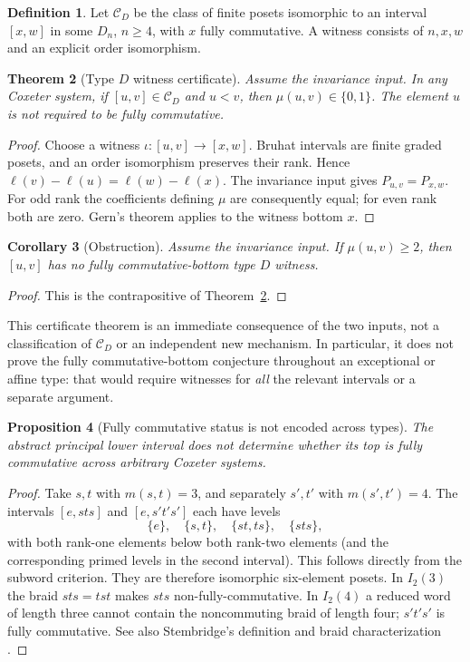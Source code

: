 \documentclass[11pt]{article}
\newtheorem{theorem}{Theorem}[section]
\newtheorem{corollary}[theorem]{Corollary}
\newtheorem{proposition}[theorem]{Proposition}
\theoremstyle{definition}\newtheorem{definition}[theorem]{Definition}
\theoremstyle{remark}\newtheorem{remark}[theorem]{Remark}
\newcommand{\CD}{\mathcal C_D}
\begin{document}
\begin{definition}
Let $\CD$ be the class of finite posets isomorphic to an interval $[x,w]$
in some $D_n$, $n\geq4$, with $x$ fully commutative.
A witness consists of $n,x,w$ and an explicit order isomorphism.
\end{definition}

\begin{theorem}[Type $D$ witness certificate]\label{thm:transfer}
Assume the invariance input. In any Coxeter system, if $[u,v]\in\CD$
and $u<v$, then $\mu(u,v)\in\{0,1\}$.
The element $u$ is not required to be fully commutative.
\end{theorem}
\begin{proof}
Choose a witness $\iota:[u,v]\longrightarrow[x,w]$.
Bruhat intervals are finite graded posets, and an order isomorphism
preserves their rank. Hence
$\ell(v)-\ell(u)=\ell(w)-\ell(x)$.
The invariance input gives $P_{u,v}=P_{x,w}$. For odd rank the coefficients
defining $\mu$ are consequently equal; for even rank both are zero.
Gern's theorem applies to the witness bottom $x$.
\end{proof}

\begin{corollary}[Obstruction]\label{cor:obstruction}
Assume the invariance input. If $\mu(u,v)\geq2$, then $[u,v]$ has no
fully commutative-bottom type $D$ witness.
\end{corollary}
\begin{proof}This is the contrapositive of Theorem~\ref{thm:transfer}.\end{proof}

This certificate theorem is an immediate consequence of the two inputs,
not a classification of $\CD$ or an independent new mechanism.
In particular, it does not prove the fully commutative-bottom conjecture
throughout an exceptional or affine type: that would require witnesses
for \emph{all} the relevant intervals or a separate argument.

\begin{proposition}[Fully commutative status is not encoded across types]
The abstract principal lower interval does not determine whether its top
is fully commutative across arbitrary Coxeter systems.
\end{proposition}
\begin{proof}
Take $s,t$ with $m(s,t)=3$, and separately $s',t'$ with $m(s',t')=4$.
The intervals $[e,sts]$ and $[e,s't's']$ each have levels
\[
 \{e\},\quad\{s,t\},\quad\{st,ts\},\quad\{sts\},
\]
with both rank-one elements below both rank-two elements (and the
corresponding primed levels in the second interval).
This follows directly from the subword criterion. They are therefore
isomorphic six-element posets. In $I_2(3)$ the braid $sts=tst$ makes
$sts$ non-fully-commutative. In $I_2(4)$ a reduced word of length three
cannot contain the noncommuting braid of length four; $s't's'$ is fully
commutative. See also Stembridge's definition and braid characterization
\cite{stembridge}.
\end{proof}
\end{document}
